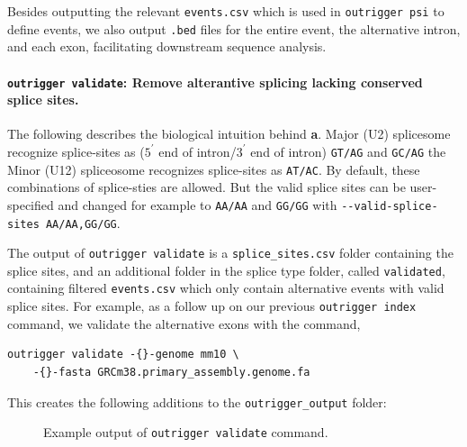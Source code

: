 Besides outputting the relevant \texttt{events.csv} which is used in \texttt{outrigger psi} to define events, we also output \texttt{.bed} files for the entire event, the alternative intron, and each exon, facilitating downstream sequence analysis.


\paragraph{\texttt{outrigger validate}: Remove alterantive splicing lacking conserved splice sites.} The following describes the biological intuition behind \textbf{a}. Major (U2) splicesome recognize splice-sites as  ($5^\prime$ end of intron/$3^\prime$ end of intron) \texttt{GT/AG} and \texttt{GC/AG} the Minor (U12) spliceosome recognizes splice-sites as \texttt{AT/AC}\cite{McManus:2011en,GarciaBlanco:2004kl}. By default, these combinations of splice-sties are allowed. But the valid splice sites can be user-specified and changed for example to \texttt{AA/AA} and \texttt{GG/GG} with \texttt{-{}-valid-splice-sites~AA/AA,GG/GG}.

The output of \texttt{outrigger validate} is a \texttt{splice\_sites.csv} folder containing the splice sites, and an additional folder in the splice type folder, called \texttt{validated}, containing filtered \texttt{events.csv} which only contain alternative events with valid splice sites. For example, as a follow up on our previous \texttt{outrigger index} command, we validate the alternative exons with the command,

\begin{verbatim}
outrigger validate -{}-genome mm10 \
    -{}-fasta GRCm38.primary_assembly.genome.fa
\end{verbatim}

This creates the following additions to the \texttt{outrigger\_output} folder:

\begin{figure}
\footnotesize
{}
\caption{Example output of \texttt{outrigger validate} command.}
\end{figure}


